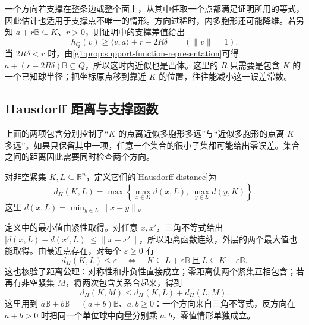 一个方向若支撑在整条边或整个面上，从其中任取一个点都满足证明所用的等式，因此估计也适用于支撑点不唯一的情形。方向过稀时，内多胞形还可能降维。若另知 \(a+r\mathbb B\subseteq K\)、\(r>0\)，则证明中的支撑差值给出
\[
	h_Q(v)\ge\langle v,a\rangle+r-2R\delta\qquad(\lVert v\rVert=1).
\]
当 \(2R\delta<r\) 时，由\cref{g1:prop:support-function-representation}可得 \(a+(r-2R\delta)\mathbb B\subseteq Q\)，所以这时内近似也是凸体。这里的 \(R\) 只需要是包含 \(K\) 的一个已知球半径；把坐标原点移到靠近 \(K\) 的位置，往往能减小这一误差常数。



\subsection{Hausdorff 距离与支撑函数}
\label{g1:subsec:B03:02}

上面的两项包含分别控制了“\(K\) 的点离近似多胞形多远”与“近似多胞形的点离 \(K\) 多远”。如果只保留其中一项，任意一个集合的很小子集都可能给出零误差。集合之间的距离因此需要同时检查两个方向。

\begin{definition}[Hausdorff 距离]\label{g1:def:hausdorff-distance}
	对非空紧集 \(K,L\subseteq\mathbb R^n\)，定义它们的[Hausdorff distance]为
	\begin{equation}\label{g1:eq:hausdorff-distance}
		d_H(K,L)=\max\left\{\max_{x\in K}d(x,L),\ \max_{y\in L}d(y,K)\right\}.
	\end{equation}
	这里 \(d(x,L)=\min_{y\in L}\lVert x-y\rVert\)。
\end{definition}

定义中的最小值由紧性取得。对任意 \(x,x'\)，三角不等式给出 \(|d(x,L)-d(x',L)|\le\lVert x-x'\rVert\)，所以距离函数连续，外层的两个最大值也能取得。由最近点存在，对每个 \(\varepsilon\ge0\) 有
\begin{equation}\label{g1:eq:hausdorff-inclusions}
	d_H(K,L)\le\varepsilon
	\quad\Longleftrightarrow\quad
	K\subseteq L+\varepsilon\mathbb B\ \text{且}\ L\subseteq K+\varepsilon\mathbb B.
\end{equation}
这也核验了距离公理：对称性和非负性直接成立；零距离使两个紧集互相包含；若再有非空紧集 \(M\)，将两次包含关系合起来，得到
\[
	d_H(K,M)\le d_H(K,L)+d_H(L,M).
\]
这里用到 \(a\mathbb B+b\mathbb B=(a+b)\mathbb B\)、\(a,b\ge0\)：一个方向来自三角不等式，反方向在 \(a+b>0\) 时把同一个单位球中向量分别乘 \(a,b\)，零值情形单独成立。

